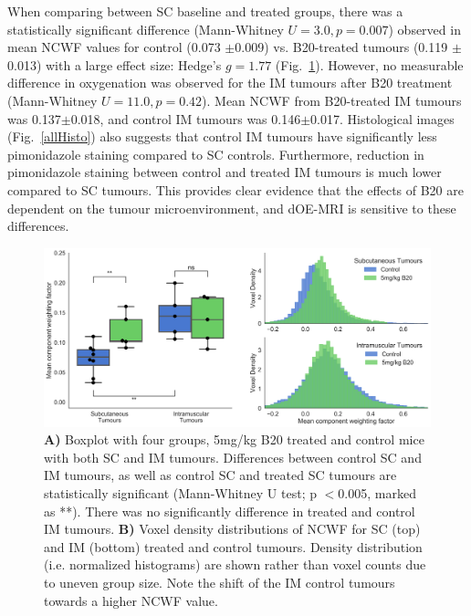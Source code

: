 When comparing between \acs{SC} baseline and treated groups, there was a statistically significant difference (Mann-Whitney $U = 3.0, p = 0.007$) observed in mean \acs{NCWF} values for control (0.073 $\pm$0.009) vs. B20-treated tumours (0.119 $\pm$0.013) with a large effect size: Hedge's ${g=1.77}$ (Fig.~\ref{OEP8boxplot}).
However, no measurable difference in oxygenation was observed for the \acs{IM} tumours after B20 treatment (Mann-Whitney $U = 11.0, p = 0.42$).
Mean \acs{NCWF} from B20-treated \acs{IM} tumours was 0.137$\pm$0.018, and control \acs{IM} tumours was 0.146$\pm$0.017. 
Histological images (Fig.~\ref{allHisto}) also suggests that control \acs{IM} tumours have significantly less pimonidazole staining compared to \acs{SC} controls.
Furthermore, reduction in pimonidazole staining between control and treated \acs{IM} tumours is much lower compared to \acs{SC} tumours.
This provides clear evidence that the effects of B20 are dependent on the tumour microenvironment, and \acs{dOE-MRI} is sensitive to these differences.

\begin{figure}[htbp]
   \centering
   \includegraphics[width=\textwidth]{oemri_thesis3/oemri_thesis3-images/4_oep8_IMSC_b20_sanitized_dOEMRI.png} %
   \caption{\textbf{A)} Boxplot with four groups, 5mg/kg B20 treated and control mice with both \acs{SC} and \acs{IM} tumours.
   Differences between control \acs{SC} and \acs{IM} tumours, as well as control \acs{SC} and treated \acs{SC} tumours are statistically significant (Mann-Whitney U test; p $<$0.005, marked as **).
   There was no significantly difference in treated and control \acs{IM} tumours.
   \textbf{B)} Voxel density distributions of \acs{NCWF} for \acs{SC} (top) and \acs{IM} (bottom) treated and control tumours.
   Density distribution (i.e. normalized histograms) are shown rather than voxel counts due to uneven group size. 
   Note the shift of the \acs{IM} control tumours towards a higher \acs{NCWF} value.}
   \label{OEP8boxplot}
\end{figure}

